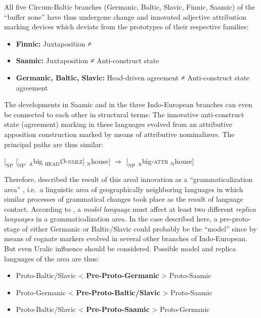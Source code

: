 All five Circum-Baltic branches (Germanic, Baltic, Slavic, Finnic, Saamic) of the “buffer zone” have thus undergone change and innovated adjective attribution marking devices which deviate from the prototypes of their respective families:
\begin{itemize}
\item	\textbf{Finnic:}
\subitem Juxtaposition ≠ 
\item	\textbf{Saamic:}
\subitem Juxtaposition ≠ Anti\hyp{}construct state
\item	\textbf{Germanic, Baltic, Slavic:}
\subitem Head\hyp{}driven agreement ≠ Anti\hyp{}construct state agreement
\end{itemize}
The developments in Saamic and in the three Indo-European branches can even be connected to each other in structural terms: The innovative anti\hyp{}construct state (agreement) marking in these languages evolved from an attributive apposition construction marked by means of attributive nominalizers. The principal  paths are thus similar:
\begin{exe}
\ex $[_{\text{NP}}$ $[_{\text{NP'}}$ $_{\text{A}}$big $_{\text{HEAD}}$Ø-\textsc{nmlz}$]$ $_{\text{N}}$house$]$ $\Rightarrow$ $[_{\text{NP}}$ $_{\text{A}}$big-\textsc{attr} $_{\text{N}}$house$]$
\end{exe}
Therefore, \citet[271]{riesler2006a} described the result of this areal innovation as a “grammaticalization area” \citep{heine-etal2005}, i.e.~a linguistic area of geographically neighboring languages in which similar processes of grammatical changes took place as the result of language contact. According to \citet{heine-etal2005}, a \textit{model language} must affect at least two different \textit{replica languages} in a grammaticalization area. In the case described here, a pre-proto-stage of either Germanic or Baltic\slash{}Slavic could probably be the “model” since  by means of cognate markers evolved in several other branches of Indo-European. But even Uralic influence should be considered. Possible model and replica languages of the area are thus:
\begin{itemize}
\item	\begin{center}Proto\hyp{}Baltic\slash{}Slavic < \textbf{Pre-Proto\hyp{}Germanic} > Proto\hyp{}Saamic\end{center}
\item	\begin{center}Proto\hyp{}Germanic < \textbf{Pre-Proto\hyp{}Baltic\slash{}Slavic} > Proto\hyp{}Saamic\end{center}
\item \begin{center}Proto\hyp{}Baltic\slash{}Slavic < \textbf{Pre-Proto\hyp{}Saamic} > Proto\hyp{}Germanic\end{center}
\end{itemize}
